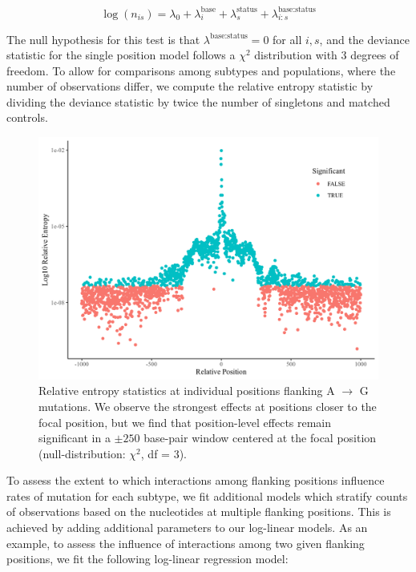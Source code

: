 \begin{equation}
    \log(n_{is}) = \lambda_0 + \lambda_{i}^{\textrm{base}} + \lambda_{s}^{\textrm{status}} + \lambda_{i:s}^{\textrm{base:status}}
\end{equation}

The null hypothesis for this test is that $\lambda^{\textrm{base:status}}=0$ for all $i,s$, and the deviance statistic for the single position model follows a $\chi^2$ distribution with 3 degrees of freedom. To allow for comparisons among subtypes and populations, where the number of observations differ, we compute the relative entropy statistic by dividing the deviance statistic by twice the number of singletons and matched controls. 

\begin{figure}
    \centering
    \includegraphics[scale=0.75]{chapters/figures/A_G_sp.png}
    \caption{Relative entropy statistics at individual positions flanking A $\rightarrow$ G mutations. We observe the strongest effects at positions closer to the focal position, but we find that position-level effects remain significant in a $\pm 250$ base-pair window centered at the focal position (null-distribution: $\chi^2$, df = 3).}
    \label{fig:single_pos}
\end{figure}

To assess the extent to which interactions among flanking positions influence rates of mutation for each subtype, we fit additional models which stratify counts of observations based on the nucleotides at multiple flanking positions. This is achieved by adding additional parameters to our log-linear models. As an example, to assess the influence of interactions among two given flanking positions, we fit the following log-linear regression model:

